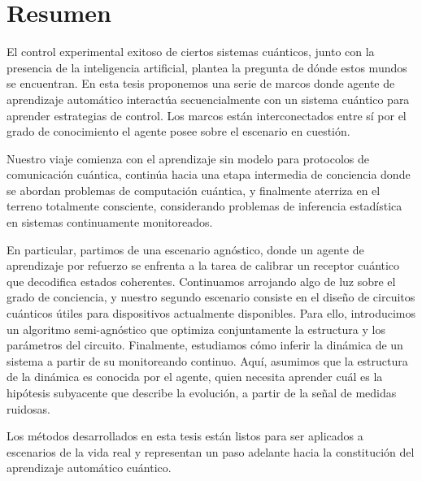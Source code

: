 \chapter*{Resumen}
El control experimental exitoso de ciertos sistemas cuánticos, junto con la presencia de la inteligencia artificial, plantea la pregunta de dónde estos mundos se encuentran. En esta tesis proponemos una serie de marcos donde agente de aprendizaje automático interactúa secuencialmente con un sistema cuántico para aprender estrategias de control. Los marcos están interconectados entre sí por el grado de conocimiento el agente posee sobre el escenario en cuestión.

Nuestro viaje comienza con el aprendizaje sin modelo para protocolos de comunicación cuántica, continúa hacia una etapa intermedia de conciencia donde se abordan problemas de computación cuántica, y finalmente aterriza en el terreno totalmente consciente, considerando problemas de inferencia estadística en sistemas continuamente monitoreados.

En particular, partimos de una escenario agnóstico, donde un agente de aprendizaje por refuerzo se enfrenta a la tarea de calibrar un receptor cuántico que decodifica estados coherentes. Continuamos arrojando algo de luz sobre el grado de conciencia, y nuestro segundo escenario consiste en el diseño de circuitos cuánticos útiles para dispositivos actualmente disponibles. Para ello, introducimos un algoritmo semi-agnóstico que optimiza conjuntamente la estructura y los parámetros del circuito. Finalmente, estudiamos cómo inferir la dinámica de un sistema a partir de su monitoreando continuo. Aquí, asumimos que la estructura de la dinámica es conocida por el agente, quien necesita aprender cuál es la hipótesis subyacente que describe la evolución, a partir de la señal de medidas ruidosas.

Los métodos desarrollados en esta tesis están listos para ser aplicados a escenarios de la vida real y representan un paso adelante hacia la constitución del aprendizaje automático cuántico.

